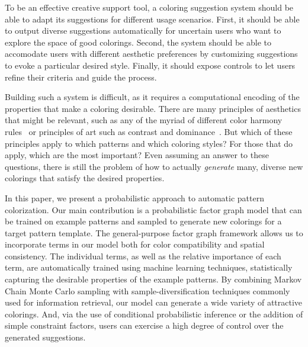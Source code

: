 To be an effective creative support tool, a coloring suggestion system should be able to adapt its suggestions for different usage scenarios. First, it should be able to output diverse suggestions automatically for uncertain users who want to explore the space of good colorings. Second, the system should be able to accomodate users with different aesthetic preferences by customizing suggestions to evoke a particular desired style. Finally, it should expose controls to let users refine their criteria and guide the process. 


Building such a system is difficult, as it requires a computational encoding of the properties that make a coloring desirable. There are many principles of aesthetics that might be relevant, such as any of the myriad of different color harmony rules~\cite{ColorHarmonyBook} or principles of art such as contrast and dominance~\cite{ArtPrinciples}. But which of these principles apply to which patterns and which coloring styles? For those that do apply, which are the most important? Even assuming an answer to these questions, there is still the problem of how to actually \emph{generate} many, diverse new colorings that satisfy the desired properties.

In this paper, we present a probabilistic approach to automatic pattern colorization. Our main contribution is a probabilistic factor graph model that can be trained on example patterns and sampled to generate new colorings for a target pattern template. The general-purpose factor graph framework allows us to incorporate terms in our model both for color compatibility and spatial consistency. The individual terms, as well as the relative importance of each term, are automatically trained using machine learning techniques, statistically capturing the desirable properties of the example patterns. By combining Markov Chain Monte Carlo sampling with sample-diversification techniques commonly used for information retrieval, our model can generate a wide variety of attractive colorings. And, via the use of conditional probabilistic inference or the addition of simple constraint factors, users can exercise a high degree of control over the generated suggestions.

